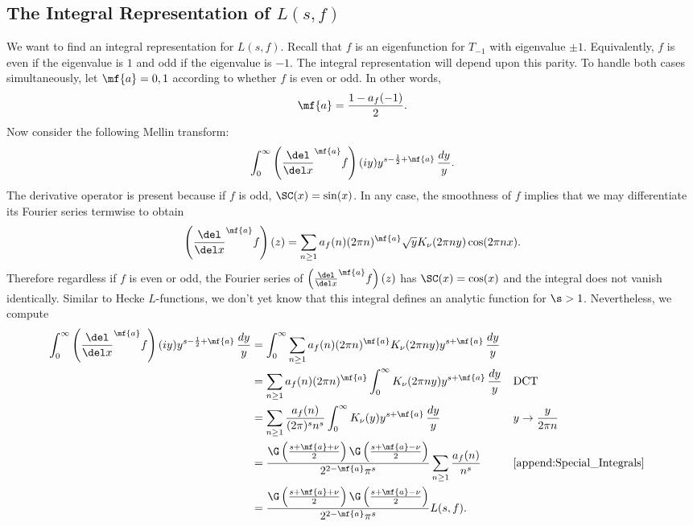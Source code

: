     \subsection*{The Integral Representation of \texorpdfstring{$L(s,f)$}{L(s,f)}}
      We want to find an integral representation for $L(s,f)$. Recall that $f$ is an eigenfunction for $T_{-1}$ with eigenvalue $\pm 1$. Equivalently, $f$ is even if the eigenvalue is $1$ and odd if the eigenvalue is $-1$. The integral representation will depend upon this parity. To handle both cases simultaneously, let $\mf{a} = 0,1$ according to whether $f$ is even or odd. In other words,
      \[
        \mf{a} = \frac{1-a_{f}(-1)}{2}.
      \]
      Now consider the following Mellin transform:
      \[
        \int_{0}^{\infty}\left(\frac{\del}{\del x}^{\mf{a}}f\right)(iy)y^{s-\frac{1}{2}+\mf{a}}\,\frac{dy}{y}.
      \]
      The derivative operator is present because if $f$ is odd, $\SC(x) = \sin(x)$. In any case, the smoothness of $f$ implies that we may differentiate its Fourier series termwise to obtain
      \[
        \left(\frac{\del}{\del x}^{\mf{a}}f\right)(z) = \sum_{n \ge 1}a_{f}(n)(2\pi n)^{\mf{a}}\sqrt{y}K_{\nu}(2\pi ny)\cos(2\pi nx).
      \]
      Therefore regardless if $f$ is even or odd, the Fourier series of $\left(\frac{\del}{\del x}^{\mf{a}}f\right)(z)$ has $\SC(x) = \cos(x)$ and the integral does not vanish identically. Similar to Hecke $L$-functions, we don't yet know that this integral defines an analytic function for $\s > 1$. Nevertheless, we compute
      \begin{align*}
        \int_{0}^{\infty}\left(\frac{\del}{\del x}^{\mf{a}}f\right)(iy)y^{s-\frac{1}{2}+\mf{a}}\,\frac{dy}{y} &= \int_{0}^{\infty}\sum_{n \ge 1}a_{f}(n)(2\pi n)^{\mf{a}}K_{\nu}(2\pi ny)y^{s+\mf{a}}\,\frac{dy}{y} \\
        &= \sum_{n \ge 1}a_{f}(n)(2\pi n)^{\mf{a}}\int_{0}^{\infty}K_{\nu}(2\pi ny)y^{s+\mf{a}}\,\frac{dy}{y} &&\text{DCT} \\
        &= \sum_{n \ge 1}\frac{a_{f}(n)}{(2\pi)^{s}n^{s}}\int_{0}^{\infty}K_{\nu}(y)y^{s+\mf{a}}\,\frac{dy}{y} &&\text{$y \to \frac{y}{2\pi n}$} \\
        &= \frac{\G\left(\frac{s+\mf{a}+\nu}{2}\right)\G\left(\frac{s+\mf{a}-\nu}{2}\right)}{2^{2-\mf{a}}\pi^{s}}\sum_{n \ge 1}\frac{a_{f}(n)}{n^{s}} && \text{\cref{append:Special_Integrals}} \\
        &= \frac{\G\left(\frac{s+\mf{a}+\nu}{2}\right)\G\left(\frac{s+\mf{a}-\nu}{2}\right)}{2^{2-\mf{a}}\pi^{s}}L(s,f).
      \end{align*}
